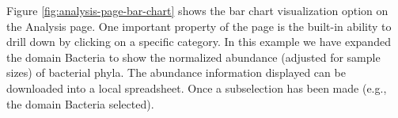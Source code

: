 \documentclass[12pt,fullpage]{report}
\begin{document}
Figure \ref{fig:analysis-page-bar-chart} shows the bar chart visualization option on the Analysis page. One important property of the page is the built-in ability to drill down by clicking on a specific category. In this example we have expanded the domain Bacteria to show the normalized abundance (adjusted for sample sizes) of bacterial phyla. The abundance information displayed can be downloaded into a local spreadsheet. Once a subselection has been made (e.g., the domain Bacteria selected).

%
%
%
%
%
\end{document}
